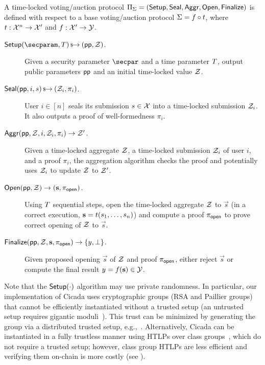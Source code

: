 \begin{definition}\label{def:syntax}
A time-locked voting/auction protocol $\Pi_\Sigma = (\mathsf{Setup}, \mathsf{Seal},\allowbreak \mathsf{Aggr}, \mathsf{Open}, \mathsf{Finalize})$ is defined with respect to a base voting/auction protocol $\Sigma = f \circ t$, where $t : \mathcal{X}^n \to \mathcal{X}'$ and $f : \mathcal{X}' \to \mathcal{Y}$. %

\begin{description}
    \item[$\Setup(\secparam, \Ttime) \randout (\pparam, \Z)$.] Given a security parameter $\secpar$ and a time parameter $T$, output public parameters $\mathsf{pp}$ and an initial time-locked value $\mathcal{Z}$.
    \item[$\mathsf{Seal}(\mathsf{pp}, i, s) \,{\mbox{\scriptsize${\$}$\normalsize}\!\!\to}\hskip2.3pt (\mathcal{Z}_i, \pi_i)$.] User $i\in[n]$ seals its submission $s \in \mathcal{X}$ into a time-locked submission %
    $\mathcal{Z}_i$. It also outputs a proof of well-formedness $\pi_i$.
    \item[$\mathsf{Aggr}(\mathsf{pp}, \mathcal{Z}, i, \mathcal{Z}_i, \pi_i) \to \mathcal{Z}'$.] Given a time-locked aggregate %
    $\mathcal{Z}$, a time-locked submission $\mathcal{Z}_i$ of user $i$, and a proof $\pi_i$, the aggregation algorithm checks the proof and potentially uses $\mathcal{Z}_i$ to update $\mathcal{Z}$ to $\mathcal{Z}'$. %
    \item[$\mathsf{Open}(\mathsf{pp}, \mathcal{Z}) \to (\mathbf{s}, \pi_{\mathsf{open}})$.] Using $T$ sequential steps, open the time-locked aggregate $\mathcal{Z}$ to $\vec{s}$ (in a correct execution, $\mathbf{s} = t(s_1, \dots, s_n)$) and compute a proof $\pi_{\mathsf{open}}$ to prove correct opening of $\mathcal{Z}$ to $\vec{s}$.
    \item[$\mathsf{Finalize}(\mathsf{pp}, \mathcal{Z}, \mathbf{s}, \pi_{\mathsf{open}}) \to \{y, \perp\}$.] Given proposed opening $\vec{s}$ of $\mathcal{Z}$ and proof $\pi_{\sf open}$, either reject $\vec{s}$ or compute the final result $y = f(\mathbf{s}) \in \mathcal{Y}$. %
\end{description}
\end{definition}

Note that the $\mathsf{Setup}(\cdot)$ algorithm may use private randomness. In particular, our implementation of Cicada uses cryptographic groups (RSA and Paillier groups) that cannot be efficiently instantiated without a trusted setup (an untrusted setup requires gigantic moduli~\cite{ICICS:Sander99}). This trust can be minimized by generating the group via a distributed trusted setup, e.g.,~\cite{JACM:BonFra01,SP:CHIKMRsVW21,TCC:DamMik10}.
Alternatively, Cicada can be instantiated in a fully trustless manner using HTLPs over class groups~\cite{CCS:TCLM21}, which do not require a trusted setup; however, class group HTLPs are less efficient and verifying them on-chain is more costly (see ).

